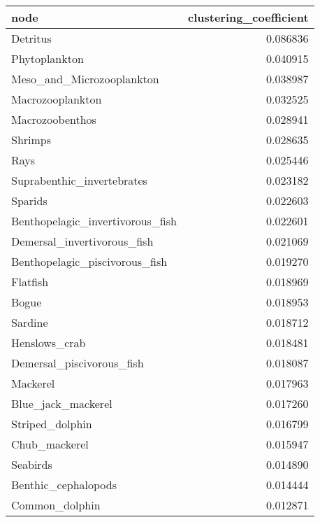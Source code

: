 \begin{tabular}{lr}
\toprule
                            node &  clustering\_coefficient \\
\midrule
                        Detritus &                0.086836 \\
                   Phytoplankton &                0.040915 \\
       Meso\_and\_Microzooplankton &                0.038987 \\
                Macrozooplankton &                0.032525 \\
                 Macrozoobenthos &                0.028941 \\
                         Shrimps &                0.028635 \\
                            Rays &                0.025446 \\
      Suprabenthic\_invertebrates &                0.023182 \\
                         Sparids &                0.022603 \\
Benthopelagic\_invertivorous\_fish &                0.022601 \\
     Demersal\_invertivorous\_fish &                0.021069 \\
  Benthopelagic\_piscivorous\_fish &                0.019270 \\
                        Flatfish &                0.018969 \\
                           Bogue &                0.018953 \\
                         Sardine &                0.018712 \\
                   Henslows\_crab &                0.018481 \\
       Demersal\_piscivorous\_fish &                0.018087 \\
                        Mackerel &                0.017963 \\
              Blue\_jack\_mackerel &                0.017260 \\
                 Striped\_dolphin &                0.016799 \\
                   Chub\_mackerel &                0.015947 \\
                        Seabirds &                0.014890 \\
             Benthic\_cephalopods &                0.014444 \\
                  Common\_dolphin &                0.012871 \\

\end{tabular}
